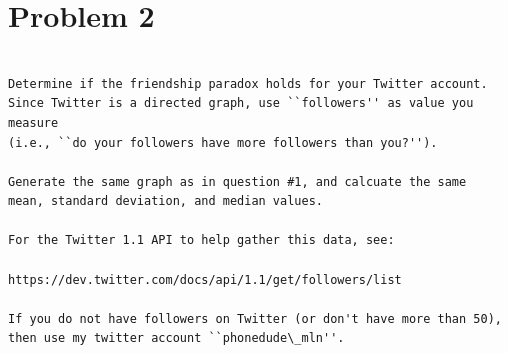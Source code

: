 

\section{Problem 2}
\label{part2}
\begin{verbatim}

Determine if the friendship paradox holds for your Twitter account.
Since Twitter is a directed graph, use ``followers'' as value you measure
(i.e., ``do your followers have more followers than you?'').

Generate the same graph as in question #1, and calcuate the same 
mean, standard deviation, and median values.

For the Twitter 1.1 API to help gather this data, see:

https://dev.twitter.com/docs/api/1.1/get/followers/list

If you do not have followers on Twitter (or don't have more than 50),
then use my twitter account ``phonedude\_mln''.

\end{verbatim}

